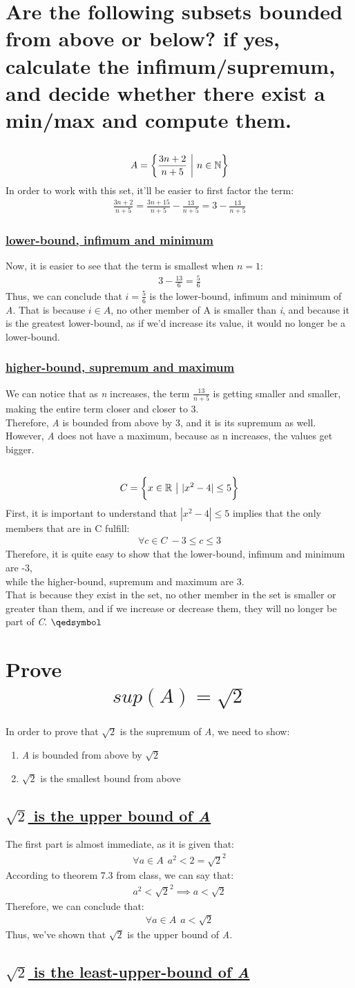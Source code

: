 \documentclass[a4paper, 12pt]{article}
\newcommand{\sub}[1]{\subsection{\underline{#1}}}
\newcommand{\subsub}[1]{\subsubsection{\underline{#1}}}
\newcommand{\R}{\ensuremath{\mathbb{R}}}
\newcommand{\N}{\ensuremath{\mathbb{N}}}
\newcommand{\eq}[1]{\begin{align*}#1\end{align*}}
\newcommand{\bigset}[1]{\bigg{\{} #1 \bigg{\}}}
\renewcommand{\qed}{\hfill\(\qedsymbol\)}
\begin{document}
\section{Are the following subsets bounded from above or below? if yes, calculate the infimum/supremum, and decide whether there exist a min/max and compute them.}
\sub{}
\eq{
    A=\bigg{\{}
        \frac{3n+2}{n+5}~\bigg{|}~n\in\N
    \bigg{\}}
}
In order to work with this set, it'll be easier to first factor the term:
\eq{
    \frac{3n+2}{n+5}=\frac{3n+15}{n+5}-\frac{13}{n+5}=3-\frac{13}{n+5}
}
\subsub{lower-bound, infimum and minimum}
Now, it is easier to see that the term is smallest when $n=1$:
\eq{
    3-\frac{13}{6}=\frac{5}{6}
}
Thus, we can conclude that $i=\frac{5}{6}$ is the lower-bound, infimum and minimum of \textit{A}.
That is because $i\in{A}$, no other member of A is smaller than \textit{i}, and because it is the greatest lower-bound,
as if we'd increase its value, it would no longer be a lower-bound.
\subsub{higher-bound, supremum and maximum}
We can notice that as \textit{n} increases, the term $\frac{13}{n+5}$ is getting smaller and smaller, making the entire term closer and closer to 3.\\
Therefore, \textit{A} is bounded from above by 3, and it is its supremum as well.\\
However, \textit{A} does not have a maximum, because as n increases, the values get bigger.
\setcounter{subsection}{2}
\sub{}
\eq{
    C=\bigset{
        x\in\R~\big{|}~|x^2-4|\leq{5}
    }        
}
First, it is important to understand that $|x^2-4|\leq{5}$ implies that the only members that are in C fulfill:
\eq{
    \forall{c}\in{C}~-3\leq{c}\leq{3}
}
Therefore, it is quite easy to show that the lower-bound, infimum and minimum are -3,\\
while the higher-bound, supremum and maximum are 3.\\
That is because they exist in the set, no other member in the set is smaller or greater than them, and if we increase or decrease them, they will no longer be part of \textit{C}.
\qed\pagebreak

\section{Prove \eq{sup(A)=\sqrt{2}}}
In order to prove that $\sqrt{2}$ is the supremum of \textit{A}, we need to show:
    \begin{enumerate}
        \item \textit{A} is bounded from above by $\sqrt{2}$
        \item $\sqrt{2}$ is the smallest bound from above
    \end{enumerate}
\sub{$\sqrt{2}$ is the upper bound of \textit{A}}
The first part is almost immediate, as it is given that:
\eq{
    \forall{a}\in{A}~~a^2<2=\sqrt{2}^2
}
According to theorem 7.3 from class, we can say that:
\eq{
    a^2<\sqrt{2}^2\implies a<\sqrt{2}
}
Therefore, we can conclude that:
\eq{
    \forall{a}\in{A}~~a<\sqrt{2}
}
Thus, we've shown that $\sqrt{2}$ is the upper bound of \textit{A}.
\sub{$\sqrt{2}$ is the least-upper-bound of \textit{A}}



\end{document}
